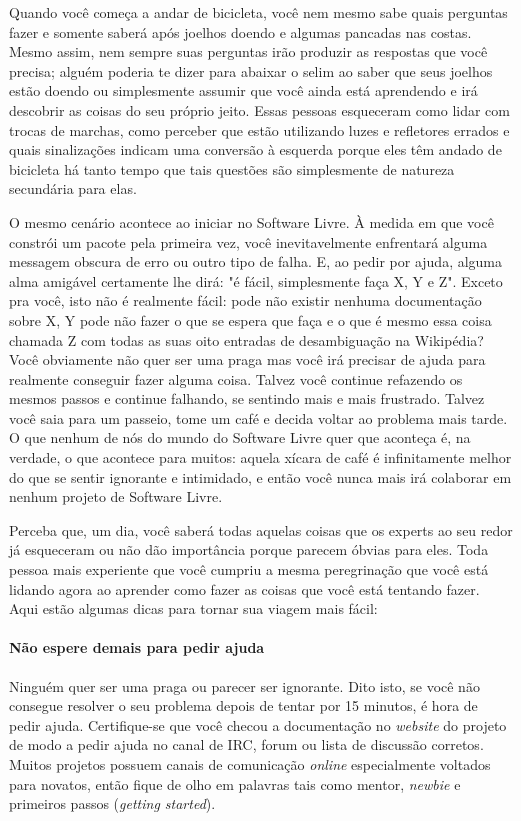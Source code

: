 Quando você começa a andar de bicicleta, você nem mesmo sabe quais perguntas fazer
e somente saberá após joelhos doendo e algumas pancadas nas costas. Mesmo assim,
nem sempre suas perguntas irão produzir as respostas que você precisa; alguém poderia
te dizer para abaixar o selim ao saber que seus joelhos estão doendo ou simplesmente
assumir que você ainda está aprendendo e irá descobrir as coisas do seu próprio jeito.
Essas pessoas esqueceram como lidar com trocas de marchas, como perceber que estão
utilizando luzes e refletores errados e quais sinalizações indicam uma conversão à
esquerda porque eles têm andado de bicicleta há tanto tempo que tais questões são
simplesmente de natureza secundária para elas.

O mesmo cenário acontece ao iniciar no Software Livre. À medida em que você constrói
um pacote pela primeira vez, você inevitavelmente enfrentará alguma messagem obscura de
erro ou outro tipo de falha. E, ao pedir por ajuda, alguma alma amigável certamente lhe
dirá: "é fácil, simplesmente faça X, Y e Z". Exceto pra você, isto não é realmente fácil:
pode não existir nenhuma documentação sobre X, Y pode não fazer o que se espera que faça
e o que é mesmo essa coisa chamada Z com todas as suas oito entradas de desambiguação
na Wikipédia? Você obviamente não quer ser uma praga mas você irá precisar de ajuda
para realmente conseguir fazer alguma coisa. Talvez você continue refazendo os mesmos
passos e continue falhando, se sentindo mais e mais frustrado. Talvez você saia para um
passeio, tome um café e decida voltar ao problema mais tarde. O que nenhum de nós do
mundo do Software Livre quer que aconteça é, na verdade, o que acontece para muitos:
aquela xícara de café é infinitamente melhor do que se sentir ignorante e intimidado,
e então você nunca mais irá colaborar em nenhum projeto de Software Livre.

Perceba que, um dia, você saberá todas aquelas coisas que os experts ao seu redor
já esqueceram ou não dão importância porque parecem óbvias para eles. Toda pessoa
mais experiente que você cumpriu a mesma peregrinação que você está lidando agora
ao aprender como fazer as coisas que você está tentando fazer. Aqui estão algumas
dicas para tornar sua viagem mais fácil:

\paragraph*{Não espere demais para pedir ajuda} Ninguém quer ser uma praga ou
parecer ser ignorante. Dito isto, se você não consegue resolver o seu problema
depois de tentar por 15 minutos, é hora de pedir ajuda. Certifique-se que você
checou a documentação no \textit{website} do projeto de modo a pedir ajuda no
canal de IRC, forum ou lista de discussão corretos. Muitos projetos possuem
canais de comunicação \textit{online} especialmente voltados para novatos, então
fique de olho em palavras tais como mentor, \textit{newbie} e primeiros passos (\textit{getting started}).

